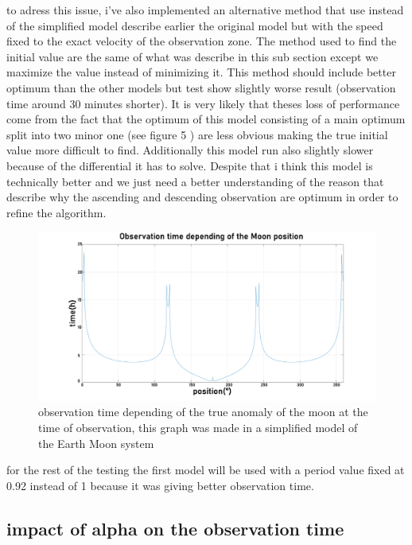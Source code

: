 \documentclass[11pt]{article} %
\begin{document}
		to adress this issue, i've also implemented an alternative method that use instead of the simplified model describe earlier the original model but with the speed fixed to the exact velocity of the observation zone. The method used to find the initial value are the same of what was describe in this sub section except we maximize the value instead of minimizing it. This method should include better optimum than the other models but test show slightly worse result (observation time around 30 minutes shorter). It is very likely that theses loss of performance come from the fact that the optimum of this model consisting of a main optimum split into two minor one (see figure 5 ) are less obvious making the true initial value more difficult to find. Additionally this model run also slightly slower because of the differential it has to solve. Despite that i think this model is technically better and we just need a better understanding of the reason that describe why the ascending and descending observation are optimum in order to refine the algorithm.
		
		\begin{figure}[h]
			\includegraphics[width=1\textwidth]{images/observation_Obs.png}
			\caption{observation time depending of the true anomaly of the moon at the time of observation, this graph was made in a simplified model of the Earth Moon system}
		\end{figure}
		
		for the rest of the testing the first model will be used with a period value fixed at 0.92 instead of 1 because it was giving better observation time.
		
		\subsection{impact of alpha on the observation time}
		
\end{document}
